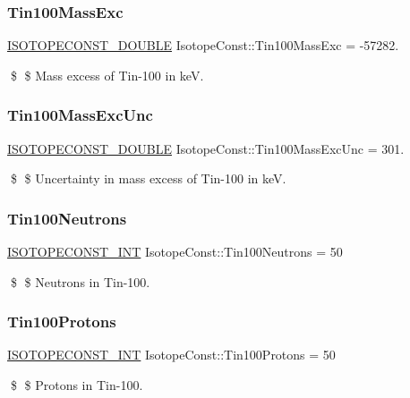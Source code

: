 \subsubsection{\texorpdfstring{Tin100\+Mass\+Exc}{Tin100MassExc}}
{\footnotesize\ttfamily \mbox{\hyperlink{group___isotope_const-_macros_ga8f45a7272ce02c0b4c65c44636ed719a}{I\+S\+O\+T\+O\+P\+E\+C\+O\+N\+S\+T\+\_\+\+D\+O\+U\+B\+LE}} Isotope\+Const\+::\+Tin100\+Mass\+Exc = -\/57282.}

\$ \$ Mass excess of Tin-\/100 in keV. \mbox{\label{group___isotope_const-_tin-_sn100_ga2bab755600e22e7a4bf218f29522af24}} 
\subsubsection{\texorpdfstring{Tin100\+Mass\+Exc\+Unc}{Tin100MassExcUnc}}
{\footnotesize\ttfamily \mbox{\hyperlink{group___isotope_const-_macros_ga8f45a7272ce02c0b4c65c44636ed719a}{I\+S\+O\+T\+O\+P\+E\+C\+O\+N\+S\+T\+\_\+\+D\+O\+U\+B\+LE}} Isotope\+Const\+::\+Tin100\+Mass\+Exc\+Unc = 301.}

\$ \$ Uncertainty in mass excess of Tin-\/100 in keV. \mbox{\label{group___isotope_const-_tin-_sn100_gac595e806d5e3e970fdd4a3d794399c3f}} 
\subsubsection{\texorpdfstring{Tin100\+Neutrons}{Tin100Neutrons}}
{\footnotesize\ttfamily \mbox{\hyperlink{group___isotope_const-_macros_ga5f18360b3e99483a35c32d789e62621c}{I\+S\+O\+T\+O\+P\+E\+C\+O\+N\+S\+T\+\_\+\+I\+NT}} Isotope\+Const\+::\+Tin100\+Neutrons = 50}

\$ \$ Neutrons in Tin-\/100. \mbox{\label{group___isotope_const-_tin-_sn100_ga439c5d2b5fa39079cfbf34f12ed266d5}} 
\subsubsection{\texorpdfstring{Tin100\+Protons}{Tin100Protons}}
{\footnotesize\ttfamily \mbox{\hyperlink{group___isotope_const-_macros_ga5f18360b3e99483a35c32d789e62621c}{I\+S\+O\+T\+O\+P\+E\+C\+O\+N\+S\+T\+\_\+\+I\+NT}} Isotope\+Const\+::\+Tin100\+Protons = 50}

\$ \$ Protons in Tin-\/100. 